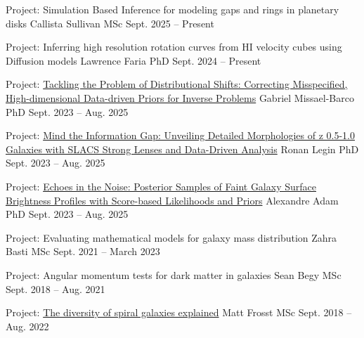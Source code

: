 \begin{cventries}
  \cventry
    {Project: Simulation Based Inference for modeling gaps and rings in planetary disks} %
    {Callista Sullivan} %
    {MSc} %
    {Sept. 2025 – Present} %

  \cventry
    {Project: Inferring high resolution rotation curves from HI velocity cubes using Diffusion models} %
    {Lawrence Faria} %
    {PhD} %
    {Sept. 2024 – Present} %


  \cventry
    {Project: \href{https://iopscience.iop.org/article/10.3847/1538-4357/ad9b92}{Tackling the Problem of Distributional Shifts: Correcting Misspecified, High-dimensional Data-driven Priors for Inverse Problems}} %
    {Gabriel Missael-Barco} %
    {PhD} %
    {Sept. 2023 – Aug. 2025} %

  \cventry
    {Project: \href{https://ui.adsabs.harvard.edu/abs/2025arXiv251119595L/abstract}{Mind the Information Gap: Unveiling Detailed Morphologies of z 0.5-1.0 Galaxies with SLACS Strong Lenses and Data-Driven Analysis}} %
    {Ronan Legin} %
    {PhD} %
    {Sept. 2023 – Aug. 2025} %

  \cventry
    {Project: \href{https://ui.adsabs.harvard.edu/abs/2025AJ....169..254A/abstract}{Echoes in the Noise: Posterior Samples of Faint Galaxy Surface Brightness Profiles with Score-based Likelihoods and Priors}} %
    {Alexandre Adam} %
    {PhD} %
    {Sept. 2023 – Aug. 2025} %

  \cventry
    {Project: Evaluating mathematical models for galaxy mass distribution} %
    {Zahra Basti} %
    {MSc} %
    {Sept. 2021 – March 2023} %

  \cventry
    {Project: Angular momentum tests for dark matter in galaxies} %
    {Sean Begy} %
    {MSc} %
    {Sept. 2018 – Aug. 2021} %

  \cventry
    {Project: \href{https://doi.org/10.1093/mnras/stac1497}{The diversity of spiral galaxies explained}} %
    {Matt Frosst} %
    {MSc} %
    {Sept. 2018 – Aug. 2022} %


\end{cventries}


